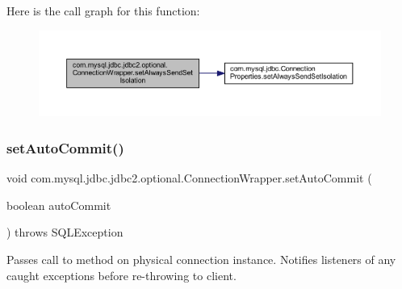 Here is the call graph for this function\+:
\nopagebreak
\begin{figure}[H]
\begin{center}
\leavevmode
\includegraphics[width=350pt]{classcom_1_1mysql_1_1jdbc_1_1jdbc2_1_1optional_1_1_connection_wrapper_a622e428378e682ed73e80bb82717478c_cgraph}
\end{center}
\end{figure}
\mbox{\label{classcom_1_1mysql_1_1jdbc_1_1jdbc2_1_1optional_1_1_connection_wrapper_ac27aa87d5bd9512af3870bd2a55af58d}} 
\subsubsection{\texorpdfstring{set\+Auto\+Commit()}{setAutoCommit()}}
{\footnotesize\ttfamily void com.\+mysql.\+jdbc.\+jdbc2.\+optional.\+Connection\+Wrapper.\+set\+Auto\+Commit (\begin{DoxyParamCaption}\item[{boolean}]{auto\+Commit }\end{DoxyParamCaption}) throws S\+Q\+L\+Exception}

Passes call to method on physical connection instance. Notifies listeners of any caught exceptions before re-\/throwing to client.

